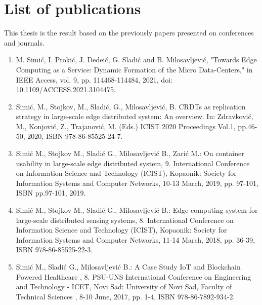 \chapter*{List of publications}
%
This thesis is the result based on the previously papers presented on conferences and journals.

\begin{enumerate}
	\item M. Simić, I. Prokić, J. Dedeić, G. Sladić and B. Milosavljević, "Towards Edge Computing as a Service: Dynamic Formation of the Micro Data-Centers," in IEEE Access, vol. 9, pp. 114468-114484, 2021, doi: 10.1109/ACCESS.2021.3104475.
	\item Simić, M., Stojkov, M., Sladić, G., Milosavljević, B.  CRDTs as replication strategy in large-scale edge distributed system: An overview. In: Zdravković, M., Konjović, Z., Trajanović, M. (Eds.) ICIST 2020 Proceedings Vol.1, pp.46-50, 2020, ISBN 978-86-85525-24-7.
	\item Simić M., Stojkov M., Sladić G., Milosavljević B., Zarić M.:   On container usability in large-scale edge distributed system, 9. International Conference on Information Science and Technology (ICIST), Kopaonik: Society for Information Systems and Computer Networks, 10-13 March, 2019, pp. 97-101, ISBN pp.97-101, 2019.
	\item Simić M., Stojkov M., Sladić G., Milosavljević B.:  Edge computing system for large-scale distributed sensing systems, 8. International Conference on Information Science and Technology (ICIST), Kopaonik: Society for Information Systems and Computer Networks, 11-14 March, 2018, pp. 36-39, ISBN 978-86-85525-22-3.
	\item Simić M., Sladić G., Milosavljević B.:  A Case Study IoT and Blockchain Powered Healthcare , 8. PSU-UNS International Conference on Engineering and Technology - ICET, Novi Sad: University of Novi Sad, Faculty of Technical Sciences , 8-10 June, 2017, pp. 1-4, ISBN 978-86-7892-934-2.
\end{enumerate}
%
%